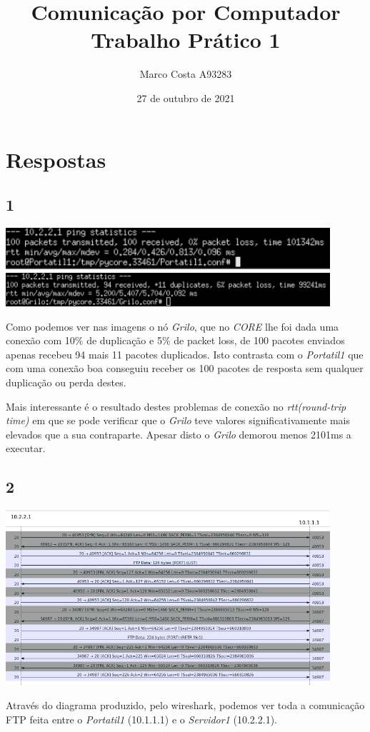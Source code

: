 \documentclass{article}
\title{
    Comunicação por Computador \\
    \large{Trabalho Prático 1}
}
\author{
    Marco Costa A93283
}
\date{27 de outubro de 2021}
\affil{
    Universidade do Minho
}
\begin{document}
        \maketitle
    \section*{Respostas}
        \subsection*{1}
            {
                \centering
                \includegraphics[width=12cm]{images/ping-portatil.png}
                \includegraphics[width=12cm]{images/ping-grilo.png}
                \par
            }
                Como podemos ver nas imagens o nó \textit{Grilo}, que no \textit{CORE} lhe foi dada
            uma conexão com 10\% de duplicação e 5\% de packet loss, de 100 pacotes enviados apenas recebeu
            94 mais 11 pacotes duplicados. Isto contrasta com o \textit{Portatil1} que com uma conexão boa conseguiu
            receber os 100 pacotes de resposta sem qualquer duplicação ou perda destes.\par

                Mais interessante é o resultado destes problemas de conexão no \textit{rtt(round-trip time)} em que se pode verificar
            que o \textit{Grilo} teve valores significativamente mais elevados que a sua contraparte. Apesar disto o \textit{Grilo} demorou
            menos 2101ms a executar.
        \subsection*{2}
            {
                \centering
                \includegraphics[width=12cm]{images/ftp-flow-graph.png}
                \par
            }
                Através do diagrama produzido, pelo wireshark, podemos ver toda a comunicação FTP feita entre o \textit{Portatil1} (10.1.1.1) e o \textit{Servidor1} (10.2.2.1).
\end{document}
